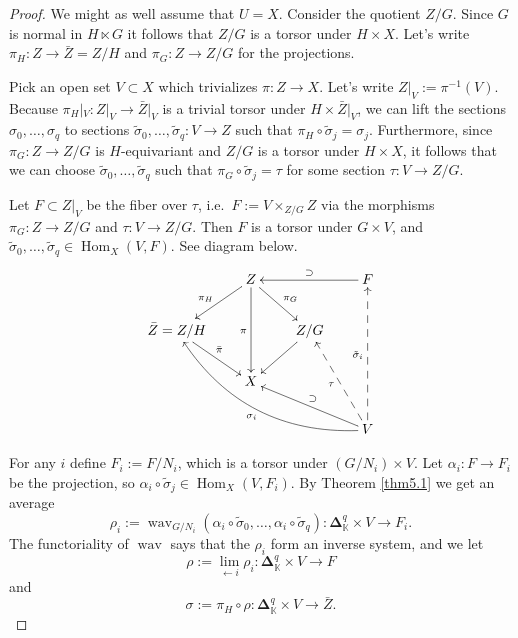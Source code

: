 \documentclass[10pt]{amsart}
\theoremstyle{definition}
\numberwithin{equation}{section}
\newcommand{\opn}{\operatorname}
\newcommand{\mbb}[1]{\mathbb{#1}}
\newcommand{\bsym}[1]{\boldsymbol{#1}}
\newcommand{\til}[1]{\tilde{#1}}
\newcommand{\K}{\mbb{K}}
\begin{document}
\begin{proof}
We might as well assume that $U = X$. Consider the quotient 
$Z / G$. Since $G$ is normal in $H \ltimes G$ it follows that
$Z / G$ is a torsor under $H \times X$. Let's write 
$\pi_H : Z \to \bar{Z} = Z / H$ and 
$\pi_G : Z \to Z / G$ for the projections. 

Pick an open set $V \subset X$ which trivializes $\pi : Z \to X$. 
Let's write $Z|_V := \pi^{-1}(V)$. 
Because $\pi_H|_V : Z|_V \to \bar{Z}|_V$ is a trivial torsor under
$H \times \bar{Z}|_V$, we can lift the sections 
$\sigma_0, \ldots, \sigma_q$ to sections
$\til{\sigma}_0, \ldots, \til{\sigma}_q : V \to Z$
such that $\pi_H \circ \til{\sigma}_j  = \sigma_j$.
Furthermore, since $\pi_G : Z \to Z / G$ is $H$-equivariant
and $Z / G$ is a torsor under $H \times X$, it follows that we can 
choose $\til{\sigma}_0, \ldots, \til{\sigma}_q$ such that 
$\pi_G \circ \til{\sigma}_j = \tau$ for some 
section $\tau : V \to Z / G$.

Let $F \subset Z|_V$ be the fiber over $\tau$, i.e.\
$F := V \times_{Z / G} Z$ via the morphisms 
$\pi_G : Z \to Z / G$ and $\tau : V \to Z / G$. Then $F$ is a 
torsor under $G \times V$, and
$\til{\sigma}_0, \ldots, \til{\sigma}_q \in 
\opn{Hom}_X(V, F)$.
See diagram below. 
\[ \UseTips  \xymatrix @C=5ex @R=5ex {
& Z 
\ar[dl]_{\pi_H}
\ar[dd]_{\pi}
\ar[dr]^{\pi_G}
& & F 
\ar[ll]_{\supset} \\
\bar{Z} = Z / H 
\ar[dr]^{\bar{\pi}}
& & Z / G
\ar[dl] \\
& X \\
& & & V
\ar[ull]_{\supset}
\ar@{-->}[uul]^{\tau}
\ar@{-->}[uuu]^{\til{\sigma}_i}
\ar@/^5.5ex/[llluu]^{\sigma_i}
} \]

For any $i$ define $F_i := F / N_i$, which is a torsor 
under $(G / N_i) \times V$. Let $\alpha_i : F \to F_i$ be the 
projection, so 
$\alpha_i \circ \til{\sigma}_j \in \opn{Hom}_{X}(V, F_i)$.
By Theorem \ref{thm5.1} we get an average
\begin{equation} \label{eqn2.6}
\rho_i := \opn{wav}_{G / N_i}(\alpha_i \circ \til{\sigma}_0, 
\ldots, \alpha_i \circ \til{\sigma}_q) : 
\bsym{\Delta}^q_{\K} \times V \to F_i .
\end{equation}
The functoriality of $\opn{wav}$ says that the $\rho_i$ form an 
inverse system, and we let
\begin{equation} \label{eqn2.7}
\rho := \lim_{\leftarrow i} \rho_i : 
\bsym{\Delta}^q_{\K} \times V \to F 
\end{equation}
and
\begin{equation} \label{eqn5.5}
\sigma := \pi_H \circ \rho : 
\bsym{\Delta}^q_{\K} \times V \to \bar{Z} . 
\end{equation}


\end{proof}
\end{document}
